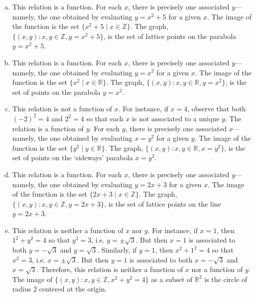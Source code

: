 \documentclass[11pt,letterpaper]{article}
\begin{document}
\sol 
\begin{enumerate}[(a)]
\item This relation is a function. For each $x$, there is precisely one associated $y$---namely, the one obtained by evaluating $y= x^2 + 5$ for a given $x$. The image of the function is the set $\{ x^2 + 5 \;|\; x \in \mathbb{Z} \}$. The graph, $\{ (x, y) \colon x, y \in \mathbb{Z}, y= x^2 + 5 \}$, is the set of lattice points on the parabola $y= x^2 + 5$. 

\item This relation is a function. For each $x$, there is precisely one associated $y$---namely, the one obtained by evaluating $y= x^2$ for a given $x$. The image of the function is the set $\{ x^2  \;|\; x \in \mathbb{R} \}$. The graph, $\{ (x, y) \colon x, y \in \mathbb{R}, y= x^2 \}$, is the set of points on the parabola $y= x^2$.  

\item This relation is not a function of $x$. For instance, if $x= 4$, observe that both $(-2)^2= 4$ and $2^2= 4$ so that each $x$ is not associated to a unique $y$. The relation is a function of $y$. For each $y$, there is precisely one associated $x$---namely, the one obtained by evaluating $x= y^2$ for a given $y$. The image of the function is the set $\{ y^2 \;|\; y \in \mathbb{R} \}$. The graph, $\{ (x, y) \colon x, y \in \mathbb{R}, x= y^2 \}$, is the set of points on the `sideways' parabola $x= y^2$.  

\item This relation is a function. For each $x$, there is precisely one associated $y$---namely, the one obtained by evaluating $y= 2x + 3$ for a given $x$. The image of the function is the set $\{ 2x + 3 \;|\; x \in \mathbb{Z} \}$. The graph, $\{ (x, y) \colon x, y \in \mathbb{Z}, y= 2x + 3 \}$, is the set of lattice points on the line $y= 2x + 3$. 

\item This relation is neither a function of $x$ nor $y$. For instance, if $x= 1$, then $1^2 + y^2= 4$ so that $y^2= 3$, i.e. $y= \pm \sqrt{3}$. But then $x= 1$ is associated to both $y= -\sqrt{3}$ and $y= \sqrt{3}$. Similarly,  if $y= 1$, then $x^2 + 1^2= 4$ so that $x^2= 3$, i.e. $x= \pm \sqrt{3}$. But then $y= 1$ is associated to both $x= -\sqrt{3}$ and $x= \sqrt{3}$. Therefore, this relation is neither a function of $x$ nor a function of $y$. The image of $\{ (x, y) \colon x, y \in \mathbb{Z}, x^2 + y^2= 4 \}$ as a subset of $\mathbb{R}^2$ is the circle of radius 2 centered at the origin. 
\end{enumerate}
\end{document}
